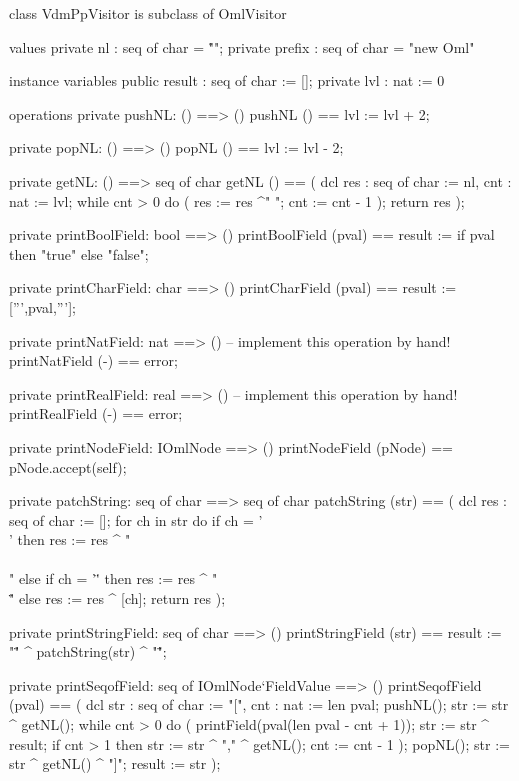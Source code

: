 \begin{vdm_al}
class VdmPpVisitor is subclass of OmlVisitor

values
  private nl : seq of char = "\r\n";
  private prefix : seq of char = "new Oml"

instance variables
  public result : seq of char := [];
  private lvl : nat := 0

operations
  private pushNL: () ==> ()
  pushNL () == lvl := lvl + 2;

  private popNL: () ==> ()
  popNL () == lvl := lvl - 2;

  private getNL: () ==> seq of char
  getNL () ==
    ( dcl res : seq of char := nl, cnt : nat := lvl;
      while cnt > 0 do ( res := res ^" "; cnt := cnt - 1 );
      return res );

  private printBoolField: bool ==> ()
  printBoolField (pval) ==
    result := if pval then "true" else "false";

  private printCharField: char ==> ()
  printCharField (pval) ==
    result := [''',pval,'''];

  private printNatField: nat ==> ()
  -- implement this operation by hand!
  printNatField (-) == error;

  private printRealField: real ==> ()
  -- implement this operation by hand!
  printRealField (-) == error;

  private printNodeField: IOmlNode ==> ()
  printNodeField (pNode) == pNode.accept(self);

  private patchString: seq of char ==> seq of char
  patchString (str) ==
   ( dcl res : seq of char := [];
     for ch in str do
       if ch = '\\' then res := res ^ "\\\\"
       else if ch = '\"' then res := res ^ "\\\""
       else res := res ^ [ch];
     return res );

  private printStringField: seq of char ==> ()
  printStringField (str) == result := "\"" ^ patchString(str) ^ "\"";

  private printSeqofField: seq of IOmlNode`FieldValue ==> ()
  printSeqofField (pval) ==
    ( dcl str : seq of char := "[", cnt : nat := len pval;
      pushNL();
      str := str ^ getNL();
      while cnt > 0 do
        ( printField(pval(len pval - cnt + 1));
          str := str ^ result;
          if cnt > 1
          then str := str ^ "," ^ getNL();
          cnt := cnt - 1 ); 
      popNL();
      str := str ^ getNL() ^ "]";
      result := str );


\end{vdm_al}
